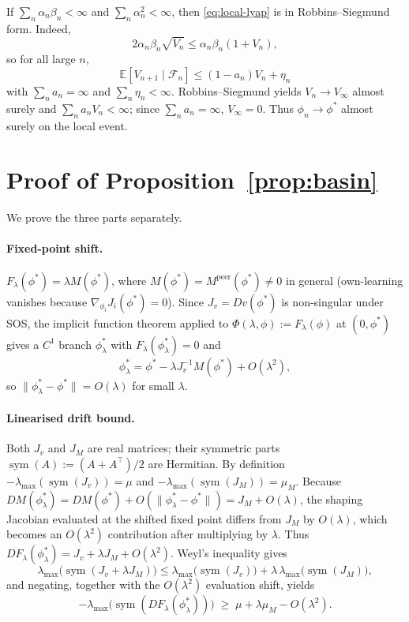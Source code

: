 \documentclass{nextgame2026} %
\newcommand{\E}{\mathbb{E}}
\newcommand{\F}{\mathcal{F}}
\begin{document}
If $\sum_n\alpha_n\beta_n<\infty$ and $\sum_n\alpha_n^2<\infty$, then \eqref{eq:local-lyap} is in Robbins--Siegmund form. Indeed,
\[
2\alpha_n\beta_n\sqrt{V_n}\le \alpha_n\beta_n(1+V_n),
\]
so for all large $n$,
\[
\E[V_{n+1}\mid\F_n]\le (1-a_n)V_n+\eta_n
\]
with $\sum_n a_n=\infty$ and $\sum_n\eta_n<\infty$. Robbins--Siegmund yields $V_n\to V_\infty$ almost surely and $\sum_n a_nV_n<\infty$; since $\sum_n a_n=\infty$, $V_\infty=0$. Thus $\phi_n\to\phi^\ast$ almost surely on the local event.

\section{Proof of Proposition~\ref{prop:basin}}\label{app:prop-basin}

We prove the three parts separately.

\paragraph{Fixed-point shift.}
$F_\lambda(\phi^\ast)=\lambda M(\phi^\ast)$, where $M(\phi^\ast)=M^{\mathrm{peer}}(\phi^\ast)\ne0$ in general (own-learning vanishes because $\nabla_{\phi_i}J_i(\phi^\ast)=0$). Since $J_v=Dv(\phi^\ast)$ is non-singular under SOS, the implicit function theorem applied to $\Phi(\lambda,\phi):=F_\lambda(\phi)$ at $(0,\phi^\ast)$ gives a $C^1$ branch $\phi^\ast_\lambda$ with $F_\lambda(\phi^\ast_\lambda)=0$ and
\[
\phi^\ast_\lambda=\phi^\ast-\lambda J_v^{-1}M(\phi^\ast)+O(\lambda^2),
\]
so $\|\phi^\ast_\lambda-\phi^\ast\|=O(\lambda)$ for small $\lambda$.

\paragraph{Linearised drift bound.}
Both $J_v$ and $J_M$ are real matrices; their symmetric parts $\operatorname{sym}(A):=(A+A^\top)/2$ are Hermitian. By definition $-\lambda_{\max}(\operatorname{sym}(J_v))=\mu$ and $-\lambda_{\max}(\operatorname{sym}(J_M))=\mu_M$. Because $DM(\phi^\ast_\lambda)=DM(\phi^\ast)+O(\|\phi^\ast_\lambda-\phi^\ast\|)=J_M+O(\lambda)$, the shaping Jacobian evaluated at the shifted fixed point differs from $J_M$ by $O(\lambda)$, which becomes an $O(\lambda^2)$ contribution after multiplying by $\lambda$. Thus $DF_\lambda(\phi^\ast_\lambda)=J_v+\lambda J_M+O(\lambda^2)$. Weyl's inequality gives
\[
\lambda_{\max}\!\bigl(\operatorname{sym}(J_v+\lambda J_M)\bigr)\le \lambda_{\max}\!\bigl(\operatorname{sym}(J_v)\bigr)+\lambda\,\lambda_{\max}\!\bigl(\operatorname{sym}(J_M)\bigr),
\]
and negating, together with the $O(\lambda^2)$ evaluation shift, yields
\begin{equation}\label{eq:weyl}
-\lambda_{\max}\!\bigl(\operatorname{sym}(DF_\lambda(\phi^\ast_\lambda))\bigr)\;\ge\;\mu+\lambda\mu_M-O(\lambda^2).
\end{equation}
\end{document}
